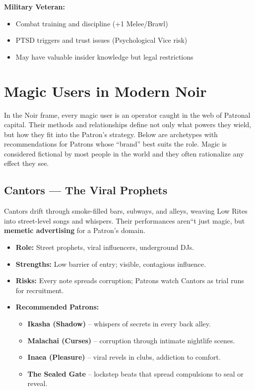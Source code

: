 \documentclass[11pt]{article}
\begin{document}
\textbf{Military Veteran:}
\begin{itemize}
\item Combat training and discipline (+1 Melee/Brawl)
\item PTSD triggers and trust issues (Psychological Vice risk)
\item May have valuable insider knowledge but legal restrictions
\end{itemize}

\section{Magic Users in Modern Noir}
\label{sec:rites-users-noir}

In the Noir frame, every magic user is an operator caught in the web of Patronal capital. Their methods and relationships define not only what powers they wield, but how they fit into the Patron's strategy. Below are archetypes with recommendations for Patrons whose ``brand'' best suits the role. Magic is considered fictional by most people in the world and they often rationalize any effect they see.

\subsection*{Cantors --- The Viral Prophets}
Cantors drift through smoke-filled bars, subways, and alleys, weaving Low Rites into street-level songs and whispers. Their performances aren``t just magic, but \textbf{memetic advertising} for a Patron's domain.
\begin{itemize}
  \item \textbf{Role:} Street prophets, viral influencers, underground DJs.
  \item \textbf{Strengths:} Low barrier of entry; visible, contagious influence.
  \item \textbf{Risks:} Every note spreads corruption; Patrons watch Cantors as trial runs for recruitment.
  \item \textbf{Recommended Patrons:}
    \begin{itemize}
      \item \textbf{Ikasha (Shadow)} -- whispers of secrets in every back alley.
      \item \textbf{Malachai (Curses)} -- corruption through intimate nightlife scenes.
      \item \textbf{Inaea (Pleasure)} -- viral revels in clubs, addiction to comfort.
      \item \textbf{The Sealed Gate} -- lockstep beats that spread compulsions to seal or reveal.
    \end{itemize}
\end{itemize}
\end{document}
